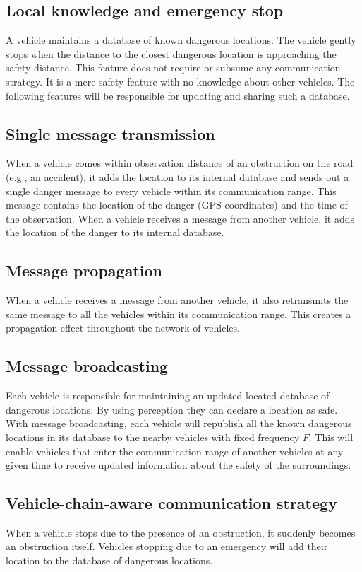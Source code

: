 \subsection{Local knowledge and emergency stop}
A vehicle maintains a database of known dangerous locations. The vehicle gently stops when the distance to the closest
dangerous location is approaching the safety distance. This feature does not require or subsume any communication
strategy. It is a mere safety feature with no knowledge about other vehicles. The following features will be responsible 
for updating and sharing such a database.

\subsection{Single message transmission}
When a vehicle comes within observation distance of an obstruction on the road (e.g., an accident), 
it adds the location to its internal database and sends out a single danger message to every vehicle within its 
communication range. This message contains the location of the danger (GPS coordinates) and the time of the observation.
When a vehicle receives a message from another vehicle, it adds the location of the danger to its internal database.

\subsection{Message propagation}
When a vehicle receives a message from another vehicle, it also retransmits the same message to all the vehicles within
its communication range. This creates a propagation effect throughout the network of vehicles.

\subsection{Message broadcasting}
Each vehicle is responsible for maintaining an updated located database of dangerous locations. By using perception
they can declare a location as safe. With message broadcasting, each vehicle will republish all the known dangerous
locations in its database to the nearby vehicles with fixed frequency $F$. This will enable vehicles that enter the
communication range of another vehicles at any given time to receive updated information about the safety of the surroundings.

\subsection{Vehicle-chain-aware communication strategy}
When a vehicle stops due to the presence of an obstruction, it suddenly becomes an obstruction itself.
Vehicles stopping due to an emergency will add their location to the database of dangerous locations.